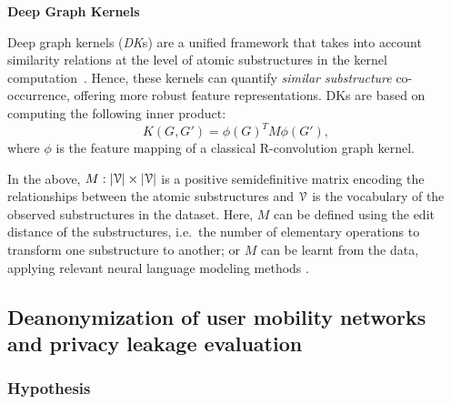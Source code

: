 \vspace{1em}
\noindent\textbf{Deep Graph Kernels}

Deep graph kernels (\emph{DK}s) are a unified framework that takes into account similarity relations at the level of atomic substructures in the kernel computation~\citep{yanardagV15}.
Hence, these kernels can quantify \emph{similar substructure} co-occurrence, offering more robust feature representations.
DKs are based on computing the following inner product:
\[
K(G, G') = \phi\left(G\right)^T M \phi\left(G'\right),
\]
where $ \phi $ is the feature mapping of a classical R-convolution graph kernel.

In the above, $M : |\mathcal{V}| \times |\mathcal{V}|$ is a positive semidefinitive matrix encoding the relationships between the atomic substructures and $ \mathcal{V} $ is the vocabulary of the observed substructures in the dataset.
Here, $ M $ can be defined using the edit distance of the substructures, i.e.\ the number of elementary operations to transform one substructure to another; or $ M $ can be learnt from the data, applying relevant neural language modeling methods \citep{mikolov2013efficient}.

\subsection{Deanonymization of user mobility networks and privacy leakage evaluation\label{sec:deanon-leakage}}

\subsubsection{Hypothesis}


